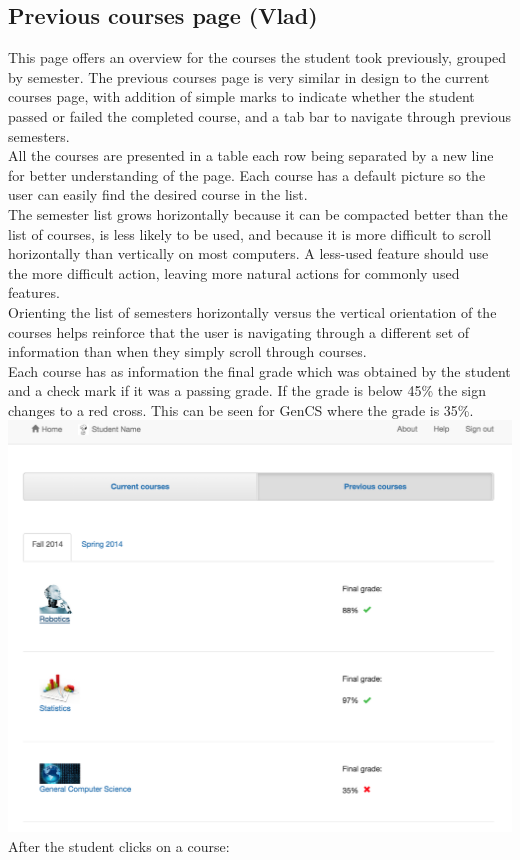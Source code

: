 \subsection{Previous courses page (Vlad)}

This page offers an overview for the courses the student took previously, grouped by semester. The previous courses page is very similar in design to the current courses page, with addition of simple marks to indicate whether the student passed or failed the completed course, and a tab bar to navigate through previous semesters.\\
All the courses are presented in a table each row being separated by a new line for better understanding of the page. Each course has a default picture so the user can easily find the desired course in the list. \\
The semester list grows horizontally because it can be compacted better than the list of courses, is less likely to be used, and because it is more difficult to scroll horizontally than vertically on most computers. A less-used feature should use the more difficult action, leaving more natural actions for commonly used features.\\
Orienting the list of semesters horizontally versus the vertical orientation of the courses helps reinforce that the user is navigating through a different set of information than when they simply scroll through courses.\\
Each course has as information the final grade which was obtained by the student and a check mark if it was a passing grade. If the grade is below 45\% the sign changes to a red cross. This can be seen for GenCS where the grade is 35\%.\\
\includegraphics[width=.6\textwidth]{screenshots/PrevoiusCoursesOverview.png}
\newpage
After the student clicks on a course:

